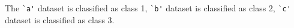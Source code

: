 \documentclass{tron}
\begin{document}
The \verb|`a'| dataset is classified as class 1, \verb|`b'| dataset is classified as class 2, \verb|`c'| dataset is classified as class 3.




\end{document}
